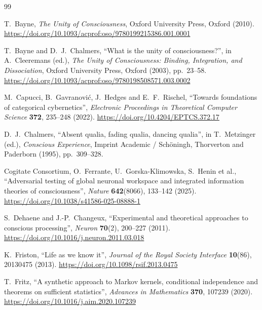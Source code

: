 \begin{thebibliography}{99}\raggedright

T.~Bayne, \emph{The Unity of Consciousness}, Oxford University Press, Oxford (2010).
\href{https://doi.org/10.1093/acprof:oso/9780199215386.001.0001}{https://doi.org/10.1093/acprof:oso/9780199215386.001.0001}

T.~Bayne and D.~J.~Chalmers, ``What is the unity of consciousness?'', in A.~Cleeremans (ed.), \emph{The Unity of Consciousness: Binding, Integration, and Dissociation}, Oxford University Press, Oxford (2003), pp.~23--58.
\href{https://doi.org/10.1093/acprof:oso/9780198508571.003.0002}{https://doi.org/10.1093/acprof:oso/9780198508571.003.0002}

M.~Capucci, B.~Gavranovi\'c, J.~Hedges and E.~F.~Rischel, ``Towards foundations of categorical cybernetics'', \emph{Electronic Proceedings in Theoretical Computer Science} \textbf{372}, 235--248 (2022).
\href{https://doi.org/10.4204/EPTCS.372.17}{https://doi.org/10.4204/EPTCS.372.17}

D.~J.~Chalmers, ``Absent qualia, fading qualia, dancing qualia'', in T.~Metzinger (ed.), \emph{Conscious Experience}, Imprint Academic / Sch\"oningh, Thorverton and Paderborn (1995), pp.~309--328.

Cogitate Consortium, O.~Ferrante, U.~Gorska-Klimowska, S.~Henin et al., ``Adversarial testing of global neuronal workspace and integrated information theories of consciousness'', \emph{Nature} \textbf{642}(8066), 133--142 (2025).
\href{https://doi.org/10.1038/s41586-025-08888-1}{https://doi.org/10.1038/s41586-025-08888-1}

S.~Dehaene and J.-P.~Changeux, ``Experimental and theoretical approaches to conscious processing'', \emph{Neuron} \textbf{70}(2), 200--227 (2011).
\href{https://doi.org/10.1016/j.neuron.2011.03.018}{https://doi.org/10.1016/j.neuron.2011.03.018}

K.~Friston, ``Life as we know it'', \emph{Journal of the Royal Society Interface} \textbf{10}(86), 20130475 (2013).
\href{https://doi.org/10.1098/rsif.2013.0475}{https://doi.org/10.1098/rsif.2013.0475}

T.~Fritz, ``A synthetic approach to Markov kernels, conditional independence and theorems on sufficient statistics'', \emph{Advances in Mathematics} \textbf{370}, 107239 (2020).
\href{https://doi.org/10.1016/j.aim.2020.107239}{https://doi.org/10.1016/j.aim.2020.107239}


\end{thebibliography}
